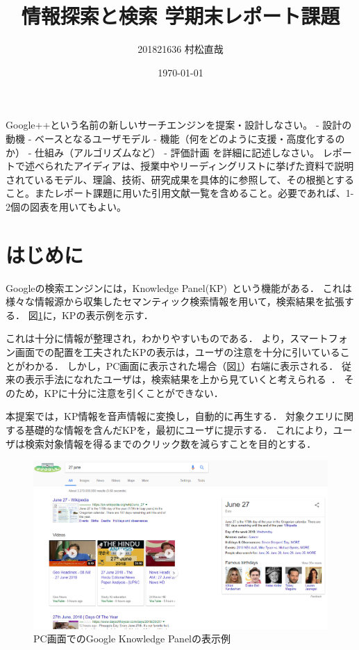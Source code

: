 \documentclass[uplatex,a4paper]{jsarticle}
\title{情報探索と検索 学期末レポート課題}
\author{201821636 村松直哉}
\date{\today}
\begin{document}
\maketitle
%
%


Google++という名前の新しいサーチエンジンを提案・設計しなさい。
- 設計の動機
- ベースとなるユーザモデル
- 機能（何をどのように支援・高度化するのか）
- 仕組み（アルゴリズムなど）
- 評価計画
を詳細に記述しなさい。
レポートで述べられたアイディアは、授業中やリーディングリストに挙げた資料で説明されているモデル、理論、技術、研究成果を具体的に参照して、その根拠とすること。またレポート課題に用いた引用文献一覧を含めること。必要であれば、1-2個の図表を用いてもよい。

\section{はじめに}
Googleの検索エンジンには，{\rm Knowledge Panel}(KP)~\cite{Amit2012}という機能がある．
これは様々な情報源から収集したセマンティック検索情報を用いて，検索結果を拡張する．
図\ref{fig:knowledgepanel}に，KPの表示例を示す．

これは十分に情報が整理され，わかりやすいものである．
\cite{Lagun}より，スマートフォン画面での配置を工夫されたKPの表示は，ユーザの注意を十分に引いていることがわかる．
しかし，PC画面に表示された場合（図\ref{fig:knowledgepanel}）右端に表示される．
従来の表示手法になれたユーザは，検索結果を上から見ていくと考えられる~\cite{Granka2004}．
そのため，KPに十分に注意を引くことができない．

本提案では，KP情報を音声情報に変換し，自動的に再生する．
対象クエリに関する基礎的な情報を含んだKPを，最初にユーザに提示する．
これにより，ユーザは検索対象情報を得るまでのクリック数を減らすことを目的とする．

\begin{figure}[htb]
\begin{center}
    \includegraphics[width=1.0\linewidth]{figs/result3.png}
\end{center}
\caption{PC画面でのGoogle Knowledge Panelの表示例}
\label{fig:knowledgepanel}
\end{figure}
\end{document}
